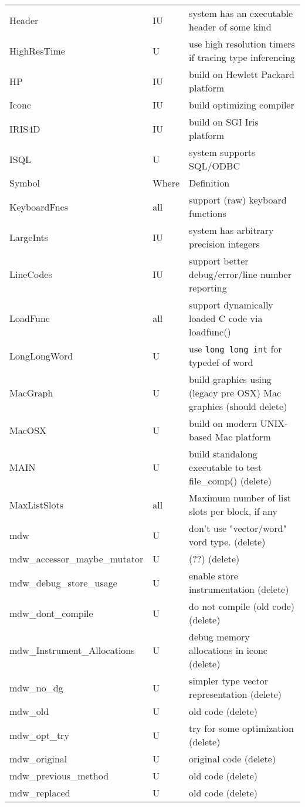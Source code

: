 \begin{xtabular}{|m{1.8in}|m{0.5in}|m{4.0in}|}
Header & IU & system has an executable header of some kind \\
HighResTime & U & use high resolution timers if tracing type inferencing \\
HP & IU & build on Hewlett Packard platform \\
Iconc & IU & build optimizing compiler \\
IRIS4D & IU & build on SGI Iris platform \\
ISQL & U & system supports SQL/ODBC \\
Symbol & Where & Definition \\ \hline
KeyboardFncs & all & support (raw) keyboard functions \\
LargeInts & IU & system has arbitrary precision integers \\
LineCodes & IU & support better debug/error/line number reporting \\
LoadFunc & all & support dynamically loaded C code via loadfunc() \\
LongLongWord & U & use \texttt{long long int} for typedef of word \\
MacGraph & U & build graphics using (legacy pre OSX) Mac graphics (should delete)  \\
MacOSX & U & build on modern UNIX-based Mac platform \\
MAIN & U & build standalong executable to test file\_comp() (delete) \\
MaxListSlots & all & Maximum number of list slots per block, if any \\
mdw & U & don't use "vector/word" vord type. (delete) \\
mdw\_accessor\_maybe\_mutator & U & (??) (delete) \\
mdw\_debug\_store\_usage & U & enable store instrumentation (delete) \\
mdw\_dont\_compile & U & do not compile (old code) (delete) \\
mdw\_Instrument\_Allocations & U & debug memory allocations in iconc (delete) \\
mdw\_no\_dg & U & simpler type vector representation (delete) \\
mdw\_old & U & old code (delete) \\
mdw\_opt\_try & U & try for some optimization (delete) \\
mdw\_original & U & original code (delete) \\
mdw\_previous\_method & U & old code (delete) \\
mdw\_replaced & U & old code (delete) \\

\end{xtabular}
